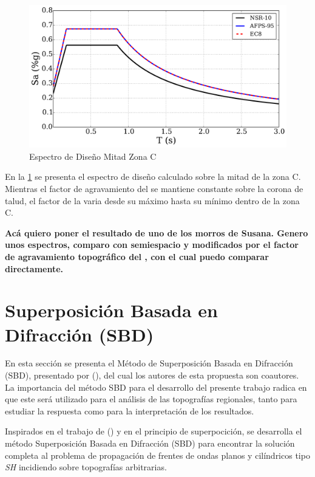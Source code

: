 \documentclass[spanish,letterpaper,12pt,twoside,openany]{article}
\begin{document}
%
\begin{figure}[H]
	\centering
	\includegraphics[width=10 cm]{img/EspectroZonaC.pdf}
	\vspace{-.5 cm}
	\caption{Espectro de Diseño Mitad Zona C}
	\label{fig:espzonc}
\end{figure}
%
En la \cref{fig:espzonc} se presenta el espectro de diseño calculado sobre la mitad de la zona C. Mientras el factor de agravamiento del \citeauthor{EC8} se mantiene constante sobre la corona de talud, el factor de la \citeauthor{AFPS1995} varia desde su máximo hasta su mínimo dentro de la zona C.

\textbf{Acá quiero poner el resultado de uno de los morros de Susana. Genero unos espectros, comparo con semiespacio y modificados por el factor de agravamiento topográfico del \citeauthor{EC8}, con el cual puedo comparar directamente.}
%
%
%
%
%
\newpage
%
\section{Superposición Basada en Difracción (SBD)}
\label{sbd}
%
En esta sección se presenta el Método de Superposición Basada en Difracción (SBD), presentado por \citeauthor{Jaramillo2013} (\citeyear{Jaramillo2013}), del cual los autores de esta propuesta son coautores. La importancia del método SBD para el desarrollo del presente trabajo radica en que este será utilizado para el análisis de las topografías regionales, tanto para estudiar la respuesta como para la interpretación de los resultados.

Inspirados en el trabajo de \citeauthor{Pathak1974} (\citeyear{Pathak1974}) y en el principio de superpocición, se desarrolla el método Superposición Basada en Difracción (SBD) para encontrar la solución completa al problema de propagación de frentes de ondas planos y cilíndricos tipo \textit{SH} incidiendo sobre topografías arbitrarias.
\end{document}
